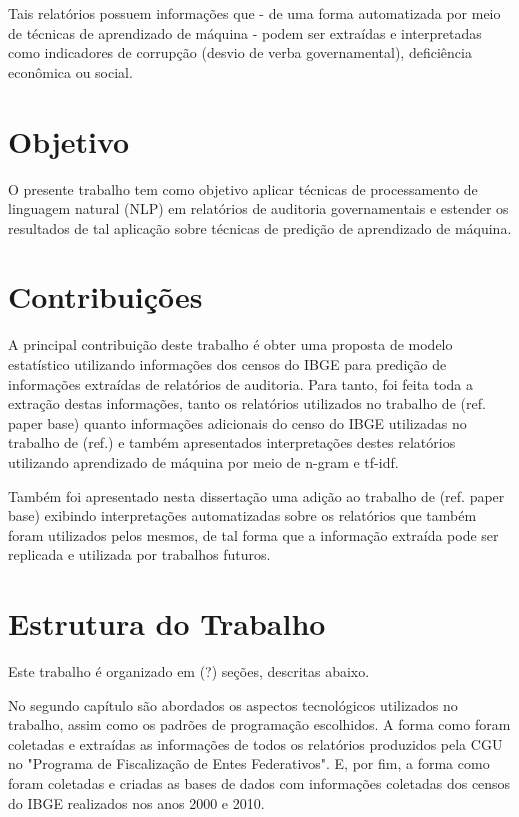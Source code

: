 Tais relatórios possuem informações que - de uma forma automatizada por meio de técnicas de aprendizado de máquina - podem ser extraídas e interpretadas como indicadores de corrupção (desvio de verba governamental), deficiência econômica ou social.

\section{Objetivo}
\label{sec:objetivo}

O presente trabalho tem como objetivo aplicar técnicas de processamento de linguagem natural (NLP) em relatórios de auditoria governamentais e estender os resultados de tal aplicação sobre técnicas de predição de aprendizado de máquina.

\section{Contribuições}
\label{sec:contribuicoes}

A principal contribuição deste trabalho é obter uma proposta de modelo estatístico utilizando informações dos censos do IBGE para predição de informações extraídas de relatórios de auditoria. Para tanto, foi feita toda a extração destas informações, tanto os relatórios utilizados no trabalho de (ref. paper base) quanto informações adicionais do censo do IBGE utilizadas no trabalho de (ref.) e também apresentados interpretações destes relatórios utilizando aprendizado de máquina por meio de n-gram e tf-idf.

Também foi apresentado nesta dissertação uma adição ao trabalho de (ref. paper base) exibindo interpretações automatizadas sobre os relatórios que também foram utilizados pelos mesmos, de tal forma que a informação extraída pode ser replicada e utilizada por trabalhos futuros.

\section{Estrutura do Trabalho}
\label{sec:estrutura_do_trabalho}

Este trabalho é organizado em (?) seções, descritas abaixo.

No segundo capítulo são abordados os aspectos tecnológicos utilizados no trabalho, assim como os padrões de programação escolhidos. A forma como foram coletadas e extraídas as informações de todos os relatórios produzidos pela CGU no "Programa de Fiscalização de Entes Federativos". E, por fim, a forma como foram coletadas e criadas as bases de dados com informações coletadas dos censos do IBGE realizados nos anos 2000 e 2010.

